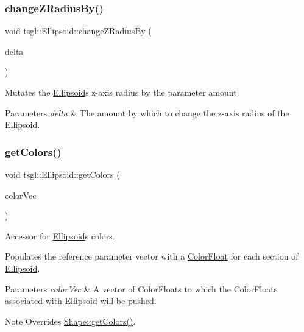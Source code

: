 \subsubsection{\texorpdfstring{change\+Z\+Radius\+By()}{changeZRadiusBy()}}
{\footnotesize\ttfamily void tsgl\+::\+Ellipsoid\+::change\+Z\+Radius\+By (\begin{DoxyParamCaption}\item[{G\+Lfloat}]{delta }\end{DoxyParamCaption})\hspace{0.3cm}{\ttfamily [virtual]}}



Mutates the \hyperlink{classtsgl_1_1_ellipsoid}{Ellipsoid}\textquotesingle{}s z-\/axis radius by the parameter amount. 


\begin{DoxyParams}{Parameters}
{\em delta} & The amount by which to change the z-\/axis radius of the \hyperlink{classtsgl_1_1_ellipsoid}{Ellipsoid}. \\
\hline
\end{DoxyParams}
\mbox{\label{classtsgl_1_1_ellipsoid_ac5c9278659df646c17ef4172e13c7cb3}} 
\subsubsection{\texorpdfstring{get\+Colors()}{getColors()}}
{\footnotesize\ttfamily void tsgl\+::\+Ellipsoid\+::get\+Colors (\begin{DoxyParamCaption}\item[{std\+::vector$<$ \hyperlink{structtsgl_1_1_color_float}{Color\+Float} $>$ \&}]{color\+Vec }\end{DoxyParamCaption})\hspace{0.3cm}{\ttfamily [virtual]}}



Accessor for \hyperlink{classtsgl_1_1_ellipsoid}{Ellipsoid}\textquotesingle{}s colors. 

Populates the reference parameter vector with a \hyperlink{structtsgl_1_1_color_float}{Color\+Float} for each section of \hyperlink{classtsgl_1_1_ellipsoid}{Ellipsoid}. 
\begin{DoxyParams}{Parameters}
{\em color\+Vec} & A vector of Color\+Floats to which the Color\+Floats associated with \hyperlink{classtsgl_1_1_ellipsoid}{Ellipsoid} will be pushed. \\
\hline
\end{DoxyParams}
\begin{DoxyNote}{Note}
Overrides \hyperlink{classtsgl_1_1_shape_a6f54fe4d049f69a287edf8335a9509f8}{Shape\+::get\+Colors()}. 
\end{DoxyNote}


